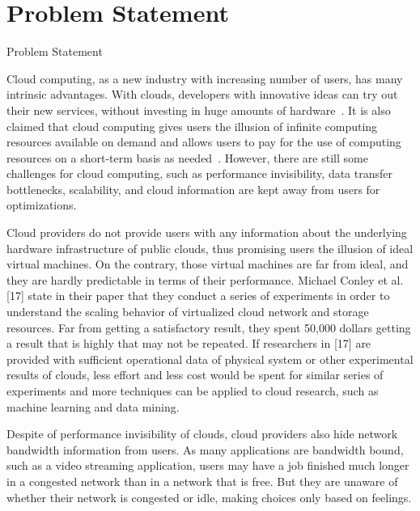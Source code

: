 \section{Problem Statement}
\label{sec:ProblemStatement}

Problem Statement

Cloud computing, as a new industry with increasing number of users, has many intrinsic advantages. With clouds, developers with innovative ideas can try out their new services, without investing in huge amounts of hardware~\cite{Armbrust2009}. It is also claimed that cloud computing gives users the illusion of infinite computing resources available on demand and allows users to pay for the use of computing resources on a short-term basis as needed~\cite{Armbrust2009}. However, there are still some challenges for cloud computing, such as performance invisibility, data transfer bottlenecks, scalability, and cloud information are kept away from users for optimizations.

  Cloud providers do not provide users with any information about the underlying hardware infrastructure of public clouds, thus promising users the illusion of ideal virtual machines. On the contrary, those virtual machines are far from ideal, and they are hardly predictable in terms of their performance. Michael Conley et al. [17] state in their paper that they conduct a series of experiments in order to understand the scaling behavior of virtualized cloud network and storage resources. Far from getting a satisfactory result, they spent 50,000 dollars getting a result that is highly that may not be repeated. If researchers in [17] are provided with sufficient operational data of physical system or other experimental results of clouds, less effort and less cost would be spent for similar series of experiments and more techniques can be applied to cloud research, such as machine learning and data mining.

  Despite of performance invisibility of clouds, cloud providers also hide network bandwidth information from users. As many applications are bandwidth bound, such as a video streaming application, users may have a job finished much longer in a congested network than in a network that is free. But they are unaware of whether their network is congested or idle, making choices only based on feelings. 


